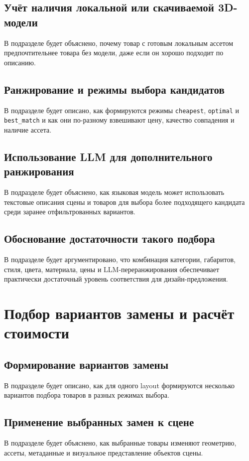 \documentclass[times]{itmo-student-thesis}
\begin{document}
\subsection{Учёт наличия локальной или скачиваемой 3D-модели}
В подразделе будет объяснено, почему товар с готовым локальным ассетом предпочтительнее товара без модели, даже если он хорошо подходит по описанию.

\subsection{Ранжирование и режимы выбора кандидатов}
В подразделе будет описано, как формируются режимы \texttt{cheapest}, \texttt{optimal} и \texttt{best\_match} и как они по-разному взвешивают цену, качество совпадения и наличие ассета.
\subsection{Использование LLM для дополнительного ранжирования}
В подразделе будет объяснено, как языковая модель может использовать текстовые описания сцены и товаров для выбора более подходящего кандидата среди заранее отфильтрованных вариантов.

\subsection{Обоснование достаточности такого подбора}
В подразделе будет аргументировано, что комбинация категории, габаритов, стиля, цвета, материала, цены и LLM-переранжирования обеспечивает практически достаточный уровень соответствия для дизайн-предложения.

\section{Подбор вариантов замены и расчёт стоимости}

\subsection{Формирование вариантов замены}
В подразделе будет описано, как для одного layout формируются несколько вариантов подбора товаров в разных режимах выбора.

\subsection{Применение выбранных замен к сцене}
В подразделе будет объяснено, как выбранные товары изменяют геометрию, ассеты, метаданные и визуальное представление объектов сцены.
\end{document}
